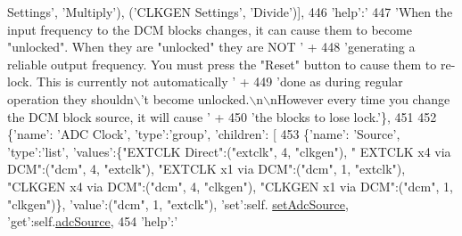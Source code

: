 \begin{DoxyCode}
{{       Settings'}, \textcolor{stringliteral}{'Multiply'}), (\textcolor{stringliteral}{'CLKGEN Settings'}, \textcolor{stringliteral}{'Divide'})],
446                       \textcolor{stringliteral}{'help'}:\textcolor{stringliteral}{'%
447                             \textcolor{stringliteral}{'When the input frequency to the DCM blocks changes, it can cause them to
       become "unlocked". When they are "unlocked" they are NOT '} +
448                             \textcolor{stringliteral}{'generating a reliable output frequency. You must press the "Reset" button to
       cause them to re-lock. This is currently not automatically '} +
449                             \textcolor{stringliteral}{'done as during regular operation they shouldn\(\backslash\)'t become unlocked.\(\backslash\)n\(\backslash\)nHowever
       every time you change the DCM block source, it will cause '} +
450                             \textcolor{stringliteral}{'the blocks to lose lock.'}\},
451 
452             \{\textcolor{stringliteral}{'name'}: \textcolor{stringliteral}{'ADC Clock'}, \textcolor{stringliteral}{'type'}:\textcolor{stringliteral}{'group'}, \textcolor{stringliteral}{'children'}: [
453                 \{\textcolor{stringliteral}{'name'}: \textcolor{stringliteral}{'Source'}, \textcolor{stringliteral}{'type'}:\textcolor{stringliteral}{'list'}, \textcolor{stringliteral}{'values'}:\{\textcolor{stringliteral}{"EXTCLK Direct"}:(\textcolor{stringliteral}{"extclk"}, 4, \textcolor{stringliteral}{"clkgen"}), \textcolor{stringliteral}{"
      EXTCLK x4 via DCM"}:(\textcolor{stringliteral}{"dcm"}, 4, \textcolor{stringliteral}{"extclk"}), \textcolor{stringliteral}{"EXTCLK x1 via DCM"}:(\textcolor{stringliteral}{"dcm"}, 1, \textcolor{stringliteral}{"extclk"}), \textcolor{stringliteral}{"CLKGEN x4 via DCM"}:(\textcolor{stringliteral}{"dcm"}, 4,
       \textcolor{stringliteral}{"clkgen"}), \textcolor{stringliteral}{"CLKGEN x1 via DCM"}:(\textcolor{stringliteral}{"dcm"}, 1, \textcolor{stringliteral}{"clkgen"})\}, \textcolor{stringliteral}{'value'}:(\textcolor{stringliteral}{"dcm"}, 1, \textcolor{stringliteral}{"extclk"}), \textcolor{stringliteral}{'set'}:self.
      \hyperlink{classsoftware_1_1chipwhisperer_1_1capture_1_1scopes_1_1__OpenADCInterface_1_1ClockSettings_a36a63656e5b6eb27d31a7bfe99acd7c9}{setAdcSource}, \textcolor{stringliteral}{'get'}:self.\hyperlink{classsoftware_1_1chipwhisperer_1_1capture_1_1scopes_1_1__OpenADCInterface_1_1ClockSettings_ad80b30f152e494893b74c9de71a28796}{adcSource},
454                           \textcolor{stringliteral}{'help'}:\textcolor{stringliteral}{'%
}}}
\end{DoxyCode}
